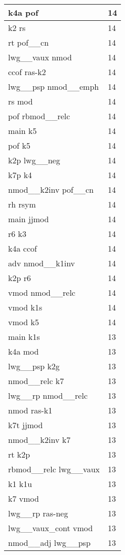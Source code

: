 \documentclass[a4 paper]{article}
\begin{document}
\begin{longtable}{p{}p{}}
k4a pof  & 14 \\ \midrule
k2 rs  & 14 \\ \midrule
rt pof\_\_cn  & 14 \\ \midrule
lwg\_\_vaux nmod  & 14 \\ \midrule
ccof ras-k2  & 14 \\ \midrule
lwg\_\_psp nmod\_\_emph  & 14 \\ \midrule
rs mod  & 14 \\ \midrule
pof rbmod\_\_relc  & 14 \\ \midrule
main k5  & 14 \\ \midrule
pof k5  & 14 \\ \midrule
k2p lwg\_\_neg  & 14 \\ \midrule
k7p k4  & 14 \\ \midrule
nmod\_\_k2inv pof\_\_cn  & 14 \\ \midrule
rh rsym  & 14 \\ \midrule
main jjmod  & 14 \\ \midrule
r6 k3  & 14 \\ \midrule
k4a ccof  & 14 \\ \midrule
adv nmod\_\_k1inv  & 14 \\ \midrule
k2p r6  & 14 \\ \midrule
vmod nmod\_\_relc  & 14 \\ \midrule
vmod k1s  & 14 \\ \midrule
vmod k5  & 14 \\ \midrule
main k1s  & 13 \\ \midrule
k4a mod  & 13 \\ \midrule
lwg\_\_psp k2g  & 13 \\ \midrule
nmod\_\_relc k7  & 13 \\ \midrule
lwg\_\_rp nmod\_\_relc  & 13 \\ \midrule
nmod ras-k1  & 13 \\ \midrule
k7t jjmod  & 13 \\ \midrule
nmod\_\_k2inv k7  & 13 \\ \midrule
rt k2p  & 13 \\ \midrule
rbmod\_\_relc lwg\_\_vaux  & 13 \\ \midrule
k1 k1u  & 13 \\ \midrule
k7 vmod  & 13 \\ \midrule
lwg\_\_rp ras-neg  & 13 \\ \midrule
lwg\_\_vaux\_cont vmod  & 13 \\ \midrule
nmod\_\_adj lwg\_\_psp  & 13 \\ \midrule

\end{longtable}
\end{document}
